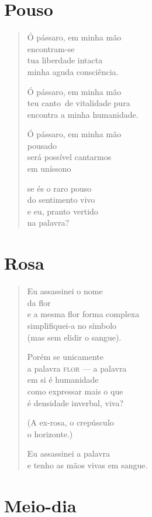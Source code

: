 \chapter{Pouso}

\begin{verse}
Ó pássaro, em minha mão\\
encontram-se\\
tua liberdade intacta\\
minha aguda consciência.

Ó pássaro, em minha mão\\
teu canto\
de vitalidade pura\\
encontra a minha humanidade.

Ó pássaro, em minha mão\\
pousado\\
será possível cantarmos\\
em uníssono

se és o raro pouso\\
do sentimento vivo\\
e eu, pranto vertido\\
na palavra?
\end{verse}

\chapter{Rosa}

\begin{verse}
Eu assassinei o nome\\
da flor\\
e a mesma flor forma complexa\\
simplifiquei-a no símbolo\\
(mas sem elidir o sangue).

Porém se unicamente\\
a palavra \textsc{flor} --- a palavra\\
em si é humanidade\\
como expressar mais o que\\
é densidade inverbal, viva?

(A ex-rosa, o crepúsculo\\
o horizonte.)

Eu assassinei a palavra\\
e tenho as mãos vivas em sangue.
\end{verse}

\chapter{Meio-dia}

